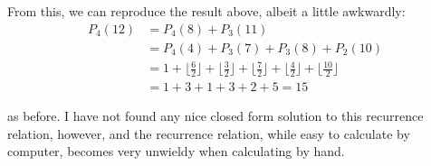 \documentclass{article}
\begin{document}
From this, we can reproduce the result above, albeit a little awkwardly:
\begin{align*}
    P_4(12) &= P_4(8) + P_3(11) \\
    &= P_4(4) + P_3(7) + P_3(8) + P_2(10) \\
    &= 1 + \lfloor \frac{6}{2} \rfloor + \lfloor \frac{3}{2} \rfloor + \lfloor \frac{7}{2} \rfloor + \lfloor \frac{4}{2} \rfloor + \lfloor \frac{10}{2} \rfloor \\
    &= 1 + 3 + 1 + 3 + 2 + 5 = 15    
\end{align*}

as before. I have not found any nice closed form solution to this recurrence relation, however, and the recurrence relation, while easy to calculate by computer, becomes very unwieldy when calculating by hand.
\end{document}
